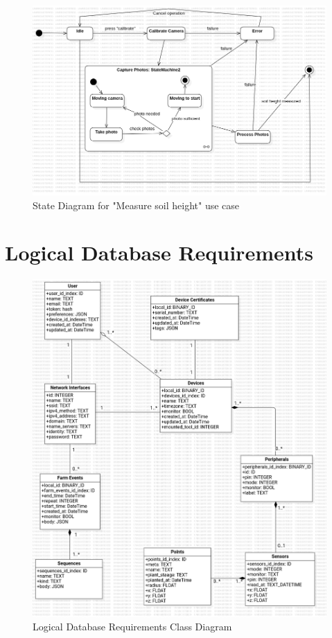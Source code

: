 \begin{figure}[H]
    \centering
    \includegraphics[width=1\textwidth]{UML Diagrams/StateDiagram_measuresoilheight.png}
    \caption{State Diagram for "Measure soil height" use case}
    \label{fig:configure-farmbot-activity-diagram}
\end{figure}

\section{Logical Database Requirements }

\begin{figure}[H]
    \centering
    \includegraphics[width=1\textwidth]{UML Diagrams/DBDiagram.png}
    \caption{Logical Database Requirements Class Diagram}
    \label{fig:LogicalDatabaseERDiagram}
\end{figure}

